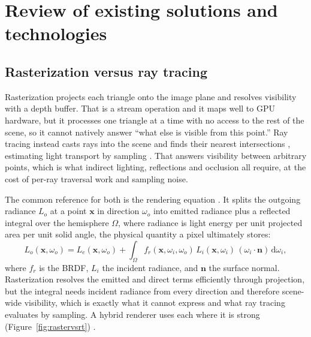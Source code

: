 \chapter{Review of existing solutions and technologies}
\label{ch:pregled}


\section{Rasterization versus ray tracing}
\label{sec:rastervsrt}

Rasterization projects each triangle onto the image plane and resolves visibility with a depth
buffer. That is a stream operation and it maps well to GPU hardware, but it processes one triangle at
a time with no access to the rest of the scene, so it cannot natively answer ``what else is visible
from this point.'' Ray tracing instead casts rays into the scene and finds their nearest
intersections \cite{moller1997raytri}, estimating light transport by sampling \cite{pharr2016pbrt}.
That answers visibility between arbitrary points, which is what indirect lighting, reflections and
occlusion all require, at the cost of per-ray traversal work and sampling noise.

The common reference for both is the rendering equation \cite{kajiya1986rendering}. It splits the
outgoing radiance $L_o$ at a point $\mathbf{x}$ in direction $\omega_o$ into emitted radiance plus a
reflected integral over the hemisphere $\Omega$, where radiance is light energy per unit projected
area per unit solid angle, the physical quantity a pixel ultimately stores:
\begin{equation}
L_o(\mathbf{x}, \omega_o) = L_e(\mathbf{x}, \omega_o) + \int_{\Omega}
f_r(\mathbf{x}, \omega_i, \omega_o)\, L_i(\mathbf{x}, \omega_i)\, (\omega_i \cdot \mathbf{n})\,
\mathrm{d}\omega_i,
\label{eq:rendering}
\end{equation}
where $f_r$ is the BRDF, $L_i$ the incident radiance, and $\mathbf{n}$ the surface normal.
Rasterization resolves the emitted and direct terms efficiently through projection, but the integral
needs incident radiance from every direction and therefore scene-wide visibility, which is exactly
what it cannot express and what ray tracing evaluates by sampling. A hybrid renderer uses each where
it is strong (Figure~\ref{fig:rastervsrt}) \cite{akenine2018rtr}.

